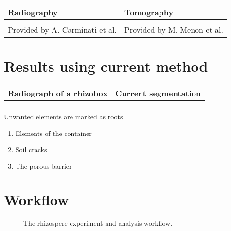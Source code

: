 \documentclass[letterpaper,10pt,english]{sphinxmanual}
\begin{document}
\begin{savenotes}\sphinxattablestart
\centering
\begin{tabulary}{\linewidth}[t]{|T|T|}
\hline
\sphinxstyletheadfamily 
Radiography
&\sphinxstyletheadfamily 
Tomography
\\
\hline
{}
&
\\
\hline
Provided by A. Carminati et al.
&
Provided by M. Menon et al.
\\
\hline
\end{tabulary}
\par
\sphinxattableend\end{savenotes}


\section{Results using current method}
\label{\detokenize{ML4NeutronImageSegmentation:results-using-current-method}}

\begin{savenotes}\sphinxattablestart
\centering
\begin{tabulary}{\linewidth}[t]{|T|T|}
\hline
\sphinxstyletheadfamily 
Radiograph of a rhizobox
&\sphinxstyletheadfamily 
Current segmentation
\\
\hline
{}
&
\\
\hline
\end{tabulary}
\par
\sphinxattableend\end{savenotes}

Unwanted elements are marked as roots
\begin{enumerate}
%
\item {} 
Elements of the container

\item {} 
Soil cracks

\item {} 
The porous barrier

\end{enumerate}


\section{Workflow}
\label{\detokenize{ML4NeutronImageSegmentation:workflow}}
\begin{figure}[htbp]
\centering
\capstart

\noindent{}
\caption{The rhizospere experiment and analysis workflow.}\label{\detokenize{ML4NeutronImageSegmentation:id21}}\end{figure}
\end{document}
